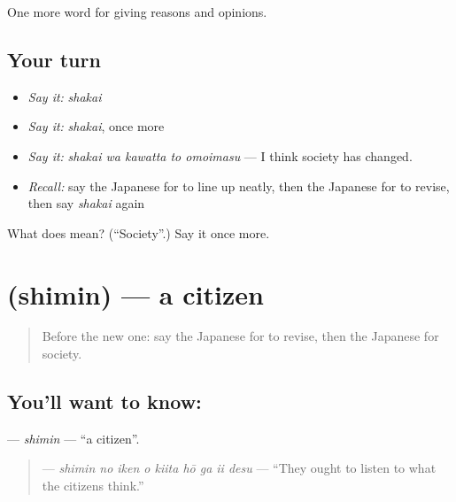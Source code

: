 \begin{grammarlens}[title={What you've built}]
One more word for giving reasons and opinions.
\end{grammarlens}

\subsection*{Your turn}
\begin{itemize}
\raggedright
  \item \emph{Say it:} \emph{shakai}
  \item \emph{Say it:} \emph{shakai}, once more
  \item \emph{Say it:} \emph{shakai wa kawatta to omoimasu} — I think society has changed.
  \item \emph{Recall:} say the Japanese for to line up neatly, then the Japanese for to revise, then say \emph{shakai} again
\end{itemize}

\begin{tcolorbox}[breakable,colback=teal!4,colframe=teal!35!black,title={Before you move on}]
What does  mean? (\textquotedblleft{}Society\textquotedblright{}.) Say it once more.
\end{tcolorbox}
\section[\texorpdfstring{\ja{しみん} (shimin)}{しみん (shimin)}]{ (shimin) — a citizen}

\label{lesson:JA-C331-shimin}



\begin{quote}
Before the new one: say the Japanese for to revise, then the Japanese for society.
\end{quote}

\subsection*{You'll want to know: }
\textbf{} — \emph{shimin} — \textquotedblleft{}a citizen\textquotedblright{}.

\begin{quote}
\textbf{    } — \emph{shimin no iken o kiita hō ga ii desu} — \textquotedblleft{}They ought to listen to what the citizens think.\textquotedblright{}
\end{quote}

